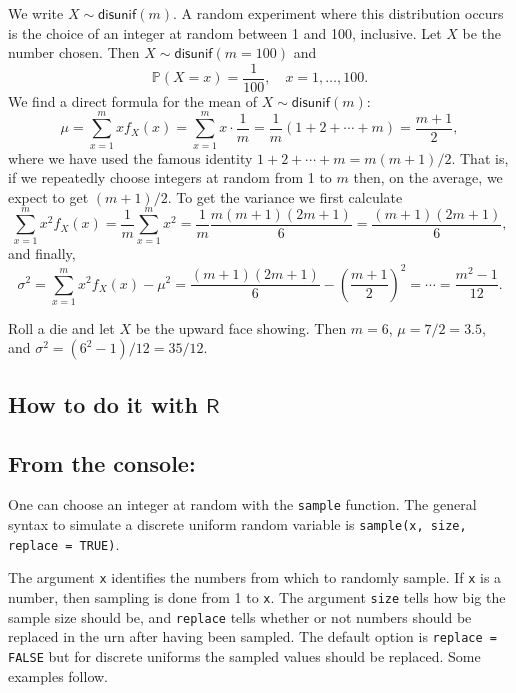 We write \(X\sim\mathsf{disunif}(m)\). A random experiment where this
distribution occurs is the choice of an integer at random between 1
and 100, inclusive. Let \(X\) be the number chosen. Then
\(X\sim\mathsf{disunif}(m=100)\) and
\[
\mathbb{P}(X=x)=\frac{1}{100},\quad x=1,\ldots,100.
\]
We find a direct formula for the mean of \(X\sim\mathsf{disunif}(m)\):
\begin{equation}
\mu = \sum_{x = 1}^{m}xf_{X}(x) = \sum_{x = 1}^{m}x \cdot \frac{1}{m} = \frac{1}{m}(1 + 2 + \cdots + m) = \frac{m + 1}{2},
\end{equation}
where we have used the famous identity \(1 + 2 + \cdots + m = m(m +
1)/2\). That is, if we repeatedly choose integers at random from 1 to
\(m\) then, on the average, we expect to get \((m+1)/2\). To get the
variance we first calculate \[ \sum_{x = 1}^{m} x^{2} f_{X}(x) =
\frac{1}{m} \sum_{x = 1}^{m} x^{2} = \frac{1}{m}\frac{m(m + 1)(2m +
1)}{6} = \frac{(m + 1)(2m + 1)}{6}, \] and finally,
\begin{equation}
\sigma^{2} = \sum_{x = 1}^{m} x^{2} f_{X}(x) - \mu^{2} = \frac{(m + 1)(2m + 1)}{6} - \left(\frac{m + 1}{2}\right)^{2} = \cdots = \frac{m^{2} - 1}{12}.
\end{equation}


Roll a die and  let \(X\) be the upward face showing.  Then \(m = 6\),
\(\mu = 7/2 = 3.5\), and \(\sigma^{2} = (6^{2} - 1)/12 = 35/12\).

\subsection{How to do it with \(\mathsf{R}\)}
\label{sec-5-2-1}

\subsection{From the console:}
\label{sec-5-2-2}
One can choose an integer at random with the \texttt{sample} function. The
general syntax to simulate a discrete uniform random variable is
\texttt{sample(x, size, replace = TRUE)}.

The argument \texttt{x} identifies the numbers from which to randomly
sample. If \texttt{x} is a number, then sampling is done from 1 to \texttt{x}. The
argument \texttt{size} tells how big the sample size should be, and \texttt{replace}
tells whether or not numbers should be replaced in the urn after
having been sampled. The default option is \texttt{replace = FALSE} but for
discrete uniforms the sampled values should be replaced. Some examples
follow.

